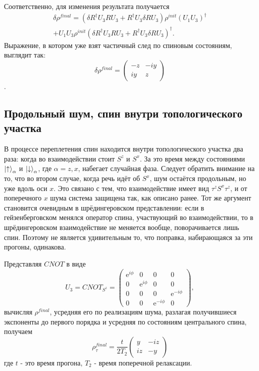 \documentclass[a4paper,12pt]{article}
\theoremstyle{plain} %
\theoremstyle{definition} %
\theoremstyle{remark} %
\begin{document}
Соответственно, для изменения результата получается
\begin{multline}
    \delta \rho^{final} = \left( \delta R^\dagger U_3 R U_3 + R^\dagger U_3 \delta R U_3 \right) \rho^{init} (U_1 U_3)^\dagger \\
    + U_1 U_3 \rho^{init} \left( \delta R^\dagger U_3 R U_3 + R^\dagger U_3 \delta R U_3 \right)^\dagger.
\end{multline}
Выражение, в котором уже взят частичный след по спиновым состояниям, выглядит так:
\begin{equation}
    \delta \rho^{final} = 
    \begin{pmatrix}
        -z & - i y \\
        i y & z
    \end{pmatrix}
\end{equation}.

\subsection{Продольный шум, спин внутри топологического участка}

В процессе переплетения спин находится внутри топологического участка два раза: когда во взаимодействии стоит $S^z$ и $S^x$.
За это время между состояниями $\ket{\uparrow}_\alpha$ и $\ket{\downarrow}_\alpha$, где $\alpha = z, x$, набегает случайная фаза.
Следует обратить внимание на то, что во втором случае, когда речь идёт об $S^x$, шум остаётся продольным, но уже вдоль оси $x$. 
Это связано с тем, что взаимодействие имеет вид $\tau^z S^x \tau^z$, и от поперечного $x$ шума система защищена так, как описано ранее. 
Тот же аргумент становится очевидным в шрёдингеровском представлении: если в гейзенберговском менялся оператор спина, участвующий во взаимодействии, то в шрёдингеровском взаимодействие не меняется вообще, поворачивается лишь спин.
Поэтому не является удивительным то, что поправка, набирающаяся за эти прогоны, одинакова.

Представляя $CNOT$ в виде
\begin{equation}
    U_3 = CNOT_{S^z} = 
    \begin{pmatrix}
        \mathrm{e}^{i \phi} & 0 & 0 & 0 \\
        0 & \mathrm{e}^{i \phi} & 0 & 0 \\
        0 & 0 & 0 & \mathrm{e}^{-i \phi} \\
        0 & 0 & \mathrm{e}^{-i \phi} & 0
    \end{pmatrix},
\end{equation}
вычисляя $\rho^{final}$, усредняя его по реализациям шума, разлагая получившиеся экспоненты до первого порядка и усредняя по состояниям центрального спина, получаем
\begin{equation}
    \rho^{final}_\tau = \frac{t}{2T_2}
    \begin{pmatrix}
        y & - i z \\
        i z & - y
    \end{pmatrix}
\end{equation}
где $t$ - это время прогона, $T_2$ - время поперечной релаксации. 
\pagebreak



\end{document}
